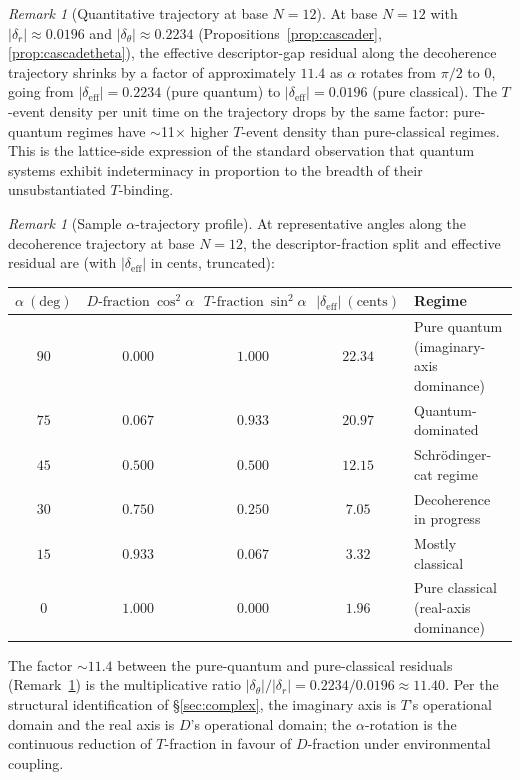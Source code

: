 \documentclass[11pt,a4paper]{article}
\theoremstyle{definition}
\theoremstyle{remark}
\newtheorem{remark}[theorem]{Remark}
\begin{document}
\begin{remark}[Quantitative trajectory at base $N=12$]\label{rem:alpha-trajectory}
At base $N=12$ with $|\delta_{r}| \approx 0.0196$ and $|\delta_{\theta}| \approx 0.2234$ (Propositions~\ref{prop:cascader}, \ref{prop:cascadetheta}), the effective descriptor-gap residual along the decoherence trajectory shrinks by a factor of approximately $11.4$ as $\alpha$ rotates from $\pi/2$ to $0$, going from $|\delta_{\mathrm{eff}}|=0.2234$ (pure quantum) to $|\delta_{\mathrm{eff}}|=0.0196$ (pure classical). The $T$-event density per unit time on the trajectory drops by the same factor: pure-quantum regimes have $\sim$11$\times$ higher $T$-event density than pure-classical regimes. This is the lattice-side expression of the standard observation that quantum systems exhibit indeterminacy in proportion to the breadth of their unsubstantiated $T$-binding.
\end{remark}

\begin{remark}[Sample $\alpha$-trajectory profile]\label{rem:alpha-profile}
At representative angles along the decoherence trajectory at base $N=12$, the descriptor-fraction split and effective residual are (with $|\delta_{\mathrm{eff}}|$ in cents, truncated):
\begin{center}
\begin{tabularx}{\textwidth}{c|c|c|c|X}
$\alpha~(\text{deg})$ & $D\text{-fraction}~\cos^{2}\alpha$ & $T\text{-fraction}~\sin^{2}\alpha$ & $|\delta_{\mathrm{eff}}|~(\text{cents})$ & Regime \\ \hline
$90$ & $0.000$ & $1.000$ & $22.34$ & Pure quantum (imaginary-axis dominance) \\
$75$ & $0.067$ & $0.933$ & $20.97$ & Quantum-dominated \\
$45$ & $0.500$ & $0.500$ & $12.15$ & Schr\"odinger-cat regime \\
$30$ & $0.750$ & $0.250$ & $7.05$ & Decoherence in progress \\
$15$ & $0.933$ & $0.067$ & $3.32$ & Mostly classical \\
$0$ & $1.000$ & $0.000$ & $1.96$ & Pure classical (real-axis dominance)
\end{tabularx}
\end{center}
The factor $\sim 11.4$ between the pure-quantum and pure-classical residuals (Remark~\ref{rem:alpha-trajectory}) is the multiplicative ratio $|\delta_{\theta}|/|\delta_{r}| = 0.2234/0.0196 \approx 11.40$. Per the structural identification of \S\ref{sec:complex}, the imaginary axis is $T$'s operational domain and the real axis is $D$'s operational domain; the $\alpha$-rotation is the continuous reduction of $T$-fraction in favour of $D$-fraction under environmental coupling.
\end{remark}
\end{document}
